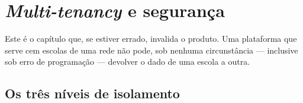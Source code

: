 \chapter{\emph{Multi-tenancy} e segurança}
\label{cap:tenancy}

Este é o capítulo que, se estiver errado, invalida o produto. Uma plataforma que
serve cem escolas de uma rede não pode, sob nenhuma circunstância --- inclusive
sob erro de programação --- devolver o dado de uma escola a outra.

\section{Os três níveis de isolamento}

